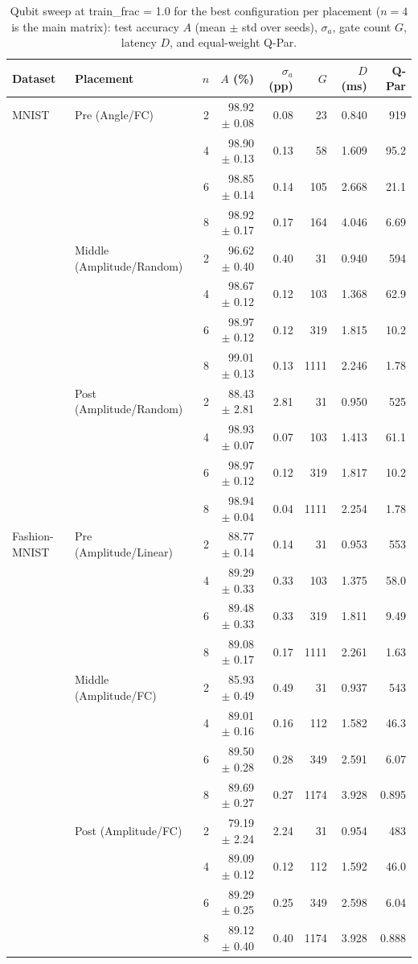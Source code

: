 \begin{table}[!t]
\centering
\caption{Qubit sweep at train\_frac = 1.0 for the best configuration per placement ($n = 4$ is the main matrix): test accuracy $A$ (mean $\pm$ std over seeds), $\sigma_a$, gate count $G$, latency $D$, and equal-weight Q-Par.}
\label{tab:sweep}
\footnotesize
\begin{tabular}{llrrrrrr}
\toprule
Dataset & Placement & $n$ & $A$ (\%) & $\sigma_a$ (pp) & $G$ & $D$ (ms) & Q-Par \\
\midrule
MNIST & Pre (Angle/FC) & 2 & 98.92 $\pm$ 0.08 & 0.08 & 23 & 0.840 & 919 \\
 &  & 4 & 98.90 $\pm$ 0.13 & 0.13 & 58 & 1.609 & 95.2 \\
 &  & 6 & 98.85 $\pm$ 0.14 & 0.14 & 105 & 2.668 & 21.1 \\
 &  & 8 & 98.92 $\pm$ 0.17 & 0.17 & 164 & 4.046 & 6.69 \\
\midrule
 & Middle (Amplitude/Random) & 2 & 96.62 $\pm$ 0.40 & 0.40 & 31 & 0.940 & 594 \\
 &  & 4 & 98.67 $\pm$ 0.12 & 0.12 & 103 & 1.368 & 62.9 \\
 &  & 6 & 98.97 $\pm$ 0.12 & 0.12 & 319 & 1.815 & 10.2 \\
 &  & 8 & 99.01 $\pm$ 0.13 & 0.13 & 1111 & 2.246 & 1.78 \\
\midrule
 & Post (Amplitude/Random) & 2 & 88.43 $\pm$ 2.81 & 2.81 & 31 & 0.950 & 525 \\
 &  & 4 & 98.93 $\pm$ 0.07 & 0.07 & 103 & 1.413 & 61.1 \\
 &  & 6 & 98.97 $\pm$ 0.12 & 0.12 & 319 & 1.817 & 10.2 \\
 &  & 8 & 98.94 $\pm$ 0.04 & 0.04 & 1111 & 2.254 & 1.78 \\
\midrule
Fashion-MNIST & Pre (Amplitude/Linear) & 2 & 88.77 $\pm$ 0.14 & 0.14 & 31 & 0.953 & 553 \\
 &  & 4 & 89.29 $\pm$ 0.33 & 0.33 & 103 & 1.375 & 58.0 \\
 &  & 6 & 89.48 $\pm$ 0.33 & 0.33 & 319 & 1.811 & 9.49 \\
 &  & 8 & 89.08 $\pm$ 0.17 & 0.17 & 1111 & 2.261 & 1.63 \\
\midrule
 & Middle (Amplitude/FC) & 2 & 85.93 $\pm$ 0.49 & 0.49 & 31 & 0.937 & 543 \\
 &  & 4 & 89.01 $\pm$ 0.16 & 0.16 & 112 & 1.582 & 46.3 \\
 &  & 6 & 89.50 $\pm$ 0.28 & 0.28 & 349 & 2.591 & 6.07 \\
 &  & 8 & 89.69 $\pm$ 0.27 & 0.27 & 1174 & 3.928 & 0.895 \\
\midrule
 & Post (Amplitude/FC) & 2 & 79.19 $\pm$ 2.24 & 2.24 & 31 & 0.954 & 483 \\
 &  & 4 & 89.09 $\pm$ 0.12 & 0.12 & 112 & 1.592 & 46.0 \\
 &  & 6 & 89.29 $\pm$ 0.25 & 0.25 & 349 & 2.598 & 6.04 \\
 &  & 8 & 89.12 $\pm$ 0.40 & 0.40 & 1174 & 3.928 & 0.888 \\
\bottomrule
\end{tabular}
\end{table}
